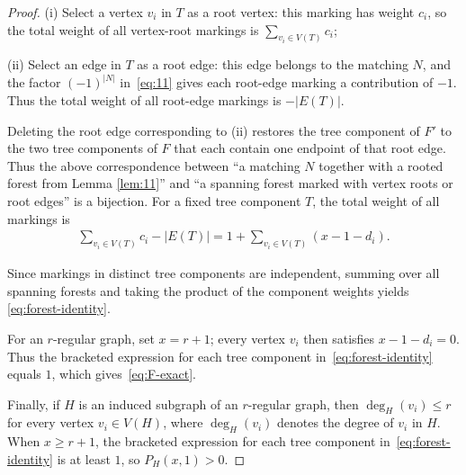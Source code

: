 \documentclass[11pt, a4paper]{article}
\begin{document}
\begin{proof}
(i) Select a vertex $v_i$ in $T$ as a root vertex: this marking has weight $c_i$,
so the total weight of all vertex-root markings is $\sum_{v_i\in V(T)}c_i$;

(ii) Select an edge in $T$ as a root edge: this edge belongs to the matching $N$, and the factor $(-1)^{|N|}$ in~\eqref{eq:11} gives each root-edge marking a contribution of $-1$.
Thus the total weight of all root-edge markings is $-|E(T)|$.

\noindent Deleting the root edge corresponding to (ii) restores the tree component of $F'$ to the two tree components of $F$ that each contain
one endpoint of that root edge.
Thus the above correspondence between ``a matching $N$ together with a rooted forest from Lemma \ref{lem:11}'' and
``a spanning forest marked with vertex roots or root edges'' is a bijection.
For a fixed tree component $T$, the total weight of all markings is
\begin{align*}
\sum_{v_i\in V(T)}c_i-|E(T)|
=1+\sum_{v_i\in V(T)}(x-1-d_i).
\end{align*}

Since markings in distinct tree components are independent, summing over all spanning forests and taking the product of the component weights yields \eqref{eq:forest-identity}.

For an $r$-regular graph, set $x=r+1$; every vertex $v_i$ then satisfies $x-1-d_i=0$.
Thus the bracketed expression for each tree component in~\eqref{eq:forest-identity} equals $1$,
which gives~\eqref{eq:F-exact}.

Finally, if $H$ is an induced subgraph of an $r$-regular graph,
then $\deg_H(v_i)\leq r$ for every vertex $v_i \in V(H)$,
where $\deg_H(v_i)$ denotes the degree of $v_i$ in $H$.
When $x\geq r+1$,
the bracketed expression for each tree component in~\eqref{eq:forest-identity} is at least $1$, so $P_H(x,1)>0$.
\end{proof}
\end{document}
